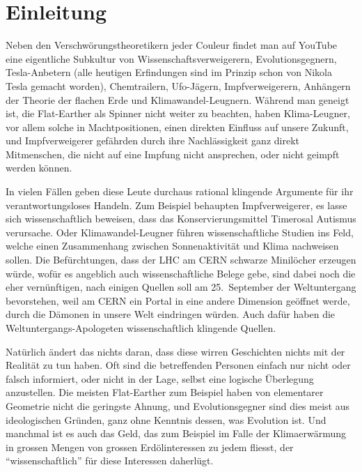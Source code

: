 %
%
%
\chapter*{Einleitung}
\label{chapter:einleitung}
Neben den Verschwörungstheoretikern jeder Couleur findet man
auf YouTube eine eigentliche Subkultur von Wissenschaftsverweigerern,
Evolutionsgegnern, Tesla-Anbetern (alle heutigen Erfindungen sind im
Prinzip schon von Nikola Tesla gemacht worden), Chemtrailern, 
Ufo-Jägern,
Impfverweigerern, Anhängern der Theorie der flachen Erde
und Klimawandel-Leugnern.
Während man geneigt ist, die Flat-Earther als Spinner nicht weiter
zu beachten, haben Klima-Leugner, vor allem solche in Machtpositionen,
einen direkten Einfluss auf unsere Zukunft, und Impfverweigerer
gefährden durch ihre Nachlässigkeit ganz direkt Mitmenschen, die
nicht auf eine Impfung nicht ansprechen, oder nicht geimpft werden
können.

In vielen Fällen geben diese Leute durchaus rational klingende
Argumente für ihr verantwortungsloses Handeln.
Zum Beispiel behaupten Impfverweigerer, es lasse sich wissenschaftlich
beweisen, dass das Konservierungsmittel Timerosal Autismus verursache.
Oder Klimawandel-Leugner führen wissenschaftliche Studien ins Feld,
welche einen Zusammenhang zwischen Sonnenaktivität und Klima 
nachweisen sollen.
Die Befürchtungen, dass der LHC am CERN schwarze Minilöcher erzeugen
würde, wofür es angeblich auch wissenschaftliche Belege gebe,
sind dabei noch die eher vernünftigen, nach einigen Quellen soll
am 25.~September der Weltuntergang bevorstehen, weil am CERN ein
Portal in eine andere Dimension geöffnet werde, durch die Dämonen
in unsere Welt eindringen würden.
Auch dafür haben die Weltuntergangs-Apologeten wissenschaftlich
klingende Quellen.

Natürlich ändert das nichts daran, dass diese wirren Geschichten
nichts mit der Realität zu tun haben.
Oft sind die betreffenden Personen einfach nur nicht oder falsch
informiert, oder nicht in der Lage, selbst eine logische Überlegung
anzustellen.
Die meisten Flat-Earther zum Beispiel haben von elementarer Geometrie
nicht die geringste Ahnung, und Evolutionsgegner sind dies meist aus
ideologischen Gründen, ganz ohne Kenntnis dessen, was Evolution ist.
Und manchmal ist es auch das Geld, das zum Beispiel im Falle der 
Klimaerwärmung in grossen Mengen von grossen Erdölinteressen zu
jedem fliesst, der ``wissenschaftlich'' für diese Interessen
daherlügt.

